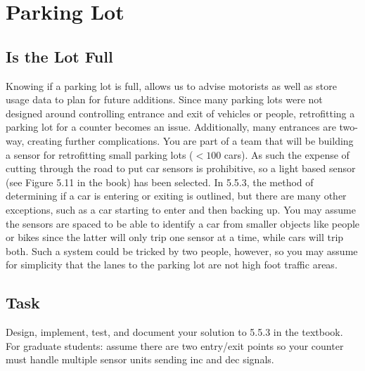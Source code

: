 \chapter{Parking Lot}

\section{Is the Lot Full}

Knowing if a parking lot is full, allows us to advise motorists as well as store usage data to plan for future additions.  Since many parking lots were not designed around controlling entrance and exit of vehicles or people, retrofitting a parking lot for a counter becomes an issue.  Additionally, many entrances are two-way, creating further complications.  You are part of a team that will be building a sensor for retrofitting small parking lots ($<100$ cars).  As such the expense of cutting through the road to put car sensors is prohibitive, so a light based sensor (see Figure 5.11 in the book) has been selected.  In 5.5.3, the method of determining if a car is entering or exiting is outlined, but there are many other exceptions, such as a car starting to enter and then backing up.  You may assume the sensors are spaced to be able to identify a car from smaller objects like people or bikes since the latter will only trip one sensor at a time, while cars will trip both.  Such a system could be tricked by two people, however, so you may assume for simplicity that the lanes to the parking lot are not high foot traffic areas.

\section{Task}

Design, implement, test, and document your solution to 5.5.3 in the textbook.  For graduate students: assume there are two entry/exit points so your counter must handle multiple sensor units sending inc and dec signals. 